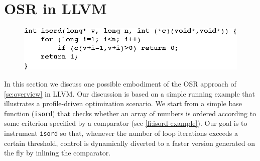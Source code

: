 
\section{OSR in LLVM}
\label{se:osr-llvm}


\ifdefined\noauthorea
\begin{figure}[t]
\begin{center}
\includegraphics[width=0.9\columnwidth]{figures/isord-example/isord.eps}
\caption{\protect}
\end{center}
\end{figure}
\fi

In this section we discuss one possible embodiment of the OSR approach of \mysection\ref{se:overview} in LLVM. Our discussion is based on a simple running example that illustrates a profile-driven optimization scenario. We start from a simple base function ({\tt isord}) that checks whether an array of numbers is ordered according to some criterion specified by a comparator (see \myfigure\ref{fi:isord-example}). Our goal is to instrument {\tt isord} so that, whenever the number of loop iterations exceeds a certain threshold, control is dynamically diverted to a faster version generated on the fly by inlining the comparator. 


